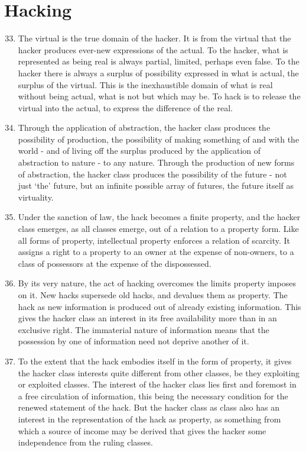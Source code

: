 \documentclass[letterpaper,12pt,english]{sphinxmanual}
\begin{document}
\section{Hacking}
\label{wark:hacking}\begin{enumerate}
\setcounter{enumi}{32}
\item {} 
The virtual is the true domain of the hacker. It is from the virtual that the hacker produces ever-new expressions of the actual. To the hacker, what is represented as being real is always partial, limited, perhaps even false. To the hacker there is always a surplus of possibility expressed in what is actual, the surplus of the virtual. This is the inexhaustible domain of what is real without being actual, what is not but which may be. To hack is to release the virtual into the actual, to express the difference of the real.

\item {} 
Through the application of abstraction, the hacker class produces the possibility of production, the possibility of making something of and with the world - and of living off the surplus produced by the application of abstraction to nature - to any nature. Through the production of new forms of abstraction, the hacker class produces the possibility of the future - not just `the' future, but an infinite possible array of futures, the future itself as virtuality.

\item {} 
Under the sanction of law, the hack becomes a finite property, and the hacker class emerges, as all classes emerge, out of a relation to a property form. Like all forms of property, intellectual property enforces a relation of scarcity. It assigns a right to a property to an owner at the expense of non-owners, to a class of possessors at the expense of the dispossessed.

\item {} 
By its very nature, the act of hacking overcomes the limits property imposes on it. New hacks supersede old hacks, and devalues them as property. The hack as new information is produced out of already existing information. This gives the hacker class an interest in its free availability more than in an exclusive right. The immaterial nature of information means that the possession by one of information need not deprive another of it.

\item {} 
To the extent that the hack embodies itself in the form of property, it gives the hacker class interests quite different from other classes, be they exploiting or exploited classes. The interest of the hacker class lies first and foremost in a free circulation of information, this being the necessary condition for the renewed statement of the hack. But the hacker class as class also has an interest in the representation of the hack as property, as something from which a source of income may be derived that gives the hacker some independence from the ruling classes.


\end{enumerate}
\end{document}

